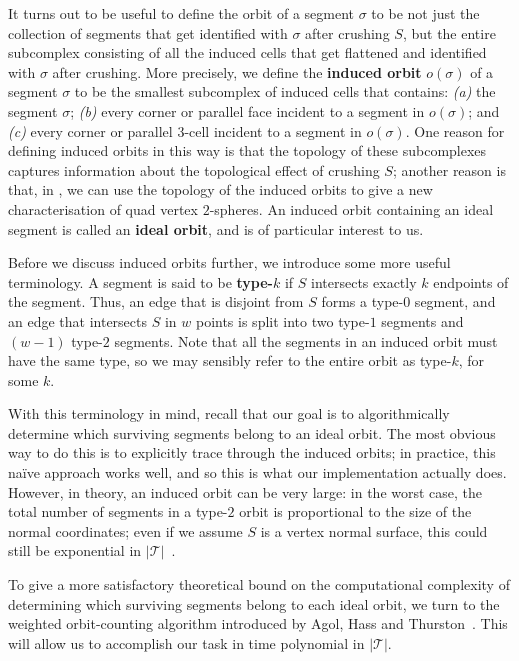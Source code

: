 \documentclass[a4paper,UKenglish,cleveref, autoref, thm-restate]{lipics-v2021}
\newcommand{\tri}{\mathcal{T}}
\begin{document}
It turns out to be useful to define the orbit of a segment $\sigma$ to be not just the collection of segments that get identified with $\sigma$ after crushing $S$,
but the entire subcomplex consisting of all the induced cells that get flattened and identified with $\sigma$ after crushing.
More precisely, we define the \textbf{induced orbit} $o(\sigma)$ of a segment $\sigma$ to be the smallest subcomplex of induced cells that contains:
\emph{(a)} the segment $\sigma$; \emph{(b)} every corner or parallel face incident to a segment in $o(\sigma)$; and \emph{(c)} every corner or parallel $3$-cell incident to a segment in $o(\sigma)$.
One reason for defining induced orbits in this way is that the topology of these subcomplexes captures information about the topological effect of crushing $S$;
another reason is that, in ,
we can use the topology of the induced orbits to give a new characterisation of quad vertex $2$-spheres.
An induced orbit containing an ideal segment is called an \textbf{ideal orbit}, and is of particular interest to us.

Before we discuss induced orbits further, we introduce some more useful terminology.
A segment is said to be \textbf{type-$k$} if $S$ intersects exactly $k$ endpoints of the segment. Thus, an edge that is disjoint from $S$ forms a type-$0$ segment, and an edge that intersects $S$ in $w$ points is split into two type-$1$ segments and $(w-1)$ type-$2$ segments.
Note that all the segments in an induced orbit must have the same type, so we may sensibly refer to the entire orbit as type-$k$, for some $k$.

With this terminology in mind, recall that our goal is to algorithmically determine which surviving segments belong to an ideal orbit.
The most obvious way to do this is to explicitly trace through the induced orbits;
in practice, this na\"{i}ve approach works well, and so this is what our implementation actually does.
However, in theory, an induced orbit can be very large:
in the worst case, the total number of segments in a type-$2$ orbit is proportional to the size of the normal coordinates;
even if we assume $S$ is a vertex normal surface, this could still be exponential in $|\tri|$~\cite[Lemma~6.1]{hass1999computational}.

To give a more satisfactory theoretical bound on the computational complexity of determining which surviving segments belong to each ideal orbit,
we turn to the weighted orbit-counting algorithm introduced by Agol, Hass and Thurston~\cite[Sections~4 and~6]{agol2006computational}.
This will allow us to accomplish our task in time polynomial in $|\tri|$.
\end{document}

